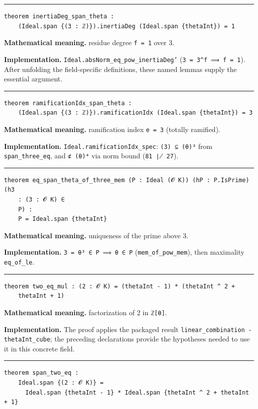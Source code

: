 \documentclass[UTF8,a4paper,11pt,fontset=fandol]{ctexart}
\theoremstyle{definition}
\newcommand{\statementsep}{\par\medskip\hrule\medskip}
\begin{document}
\statementsep
\begin{verbatim}
theorem inertiaDeg_span_theta :
    (Ideal.span {(3 : ℤ)}).inertiaDeg (Ideal.span {thetaInt}) = 1
\end{verbatim}
\noindent\textbf{Mathematical meaning.} residue degree \texttt{f = 1} over 3.\par
\noindent\textbf{Implementation.} \texttt{Ideal.\allowbreak{}absNorm\_\allowbreak{}eq\_\allowbreak{}pow\_\allowbreak{}inertiaDeg'} (\texttt{3 = 3\textasciicircum{}f ⟹ f = 1}). After unfolding the field-specific definitions, these named lemmas supply the essential argument.\par
\statementsep
\begin{verbatim}
theorem ramificationIdx_span_theta :
    (Ideal.span {(3 : ℤ)}).ramificationIdx (Ideal.span {thetaInt}) = 3
\end{verbatim}
\noindent\textbf{Mathematical meaning.} ramification index \texttt{e = 3} (totally ramified).\par
\noindent\textbf{Implementation.} \texttt{Ideal.\allowbreak{}ramificationIdx\_\allowbreak{}spec}: \texttt{(3) ⊆ (θ)³} from \texttt{span\_\allowbreak{}three\_\allowbreak{}eq}, and \texttt{⊄ (θ)⁴} via norm bound (\texttt{81 ∤ 27}).\par
\statementsep
\begin{verbatim}
theorem eq_span_theta_of_three_mem (P : Ideal (𝓞 K)) (hP : P.IsPrime) (h3
    : (3 : 𝓞 K) ∈
    P) :
    P = Ideal.span {thetaInt}
\end{verbatim}
\noindent\textbf{Mathematical meaning.} uniqueness of the prime above 3.\par
\noindent\textbf{Implementation.} \texttt{3 = θ³ ∈ P ⟹ θ ∈ P} (\texttt{mem\_\allowbreak{}of\_\allowbreak{}pow\_\allowbreak{}mem}), then maximality \texttt{eq\_\allowbreak{}of\_\allowbreak{}le}.\par
\statementsep
\begin{verbatim}
theorem two_eq_mul : (2 : 𝓞 K) = (thetaInt - 1) * (thetaInt ^ 2 +
    thetaInt + 1)
\end{verbatim}
\noindent\textbf{Mathematical meaning.} factorization of 2 in \texttt{ℤ[θ]}.\par
\noindent\textbf{Implementation.} The proof applies the packaged result \texttt{linear\_\allowbreak{}combination -thetaInt\_\allowbreak{}cube}; the preceding declarations provide the hypotheses needed to use it in this concrete field.\par
\statementsep
\begin{verbatim}
theorem span_two_eq :
    Ideal.span {(2 : 𝓞 K)} =
      Ideal.span {thetaInt - 1} * Ideal.span {thetaInt ^ 2 + thetaInt + 1}
\end{verbatim}
\end{document}
